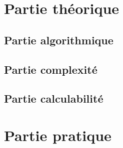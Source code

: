 \documentclass[a4paper,french,towsides,10pt]{book}
\newcommand{\clearemptydoublepage}{%
	\newpage{\pagestyle{empty}\cleardoublepage}}
\begin{document}
\renewcommand{\labelitemii}{\textasteriskcentered}

\clearemptydoublepage
\tableofcontents
\clearemptydoublepage
\chapter{Partie théorique}

\section{Partie algorithmique}

\section{Partie complexité}

\section{Partie calculabilité}

\clearemptydoublepage
\chapter{Partie pratique}

\end{document}
